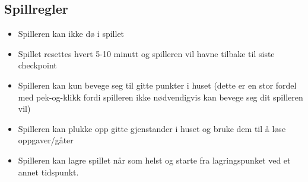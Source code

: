 \documentclass[a4paper]{article}
\begin{document}
\subsection{Spillregler}

\begin{itemize}
\item Spilleren kan ikke dø i spillet
\item Spillet resettes hvert 5-10 minutt og spilleren vil havne tilbake til siste checkpoint
\item Spilleren kan kun bevege seg til gitte punkter i huset (dette er en stor fordel med pek-og-klikk fordi spilleren ikke nødvendigvis kan bevege seg dit spilleren vil)
\item Spilleren kan plukke opp gitte gjenstander i huset og bruke dem til å løse oppgaver/gåter
\item Spilleren kan lagre spillet når som helst og starte fra lagringspunket ved et annet tidspunkt.
\end{itemize}
\end{document}
